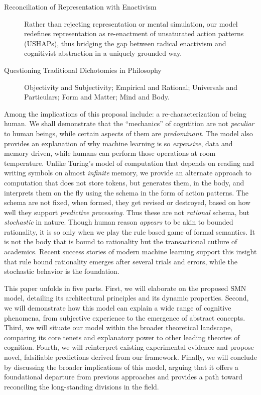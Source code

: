 \begin{description}
    \item[Reconciliation of Representation with Enactivism]
    Rather than rejecting representation or mental simulation, our model redefines representation as re-enactment of unsaturated action patterns (USHAPs), thus bridging the gap between radical enactivism and cognitivist abstraction in a uniquely grounded way.

    \item[Questioning Traditional Dichotomies in Philosophy]
    Objectivity and Subjectivity; Empirical and Rational; Universals and Particulars; Form and Matter; Mind and Body.

\end{description}


Among the implications of this proposal include: a re-characterization of being human. We shall demonstrate that the ``mechanics'' of cogntition are not \textit{peculiar} to human beings, while certain aspects of them are \textit{predominant}. The model also provides an explanation of why machine learning is so \textit{expensive}, data and memory driven, while humans can perform those operations at room temperature. Unlike Turing's model of computation that depends on reading and writing symbols on almost \textit{infinite} memory, we provide an alternate approach to computation that does not store tokens, but generates them, in the body, and interprets them on the fly using the schema in the form of action patterns. The schema are not fixed, when formed, they get revised or destroyed, based on how well they support \textit{predictive processing}. Thus these are not \textit{rational} schema, but \textit{stochastic} in nature. Though human reason \textit{appears} to be akin to bounded rationality, it is so only when we play the rule based game of formal semantics. It is not the body that is bound to rationality but the transactional cutlure of academics. Recent success stories of modern machine learning support this insight that rule bound rationality emerges after several trials and errors, while the stochastic behavior is the foundation. 

This paper unfolds in five parts. First, we will elaborate on the proposed SMN model, detailing its architectural principles and its dynamic properties. Second, we will demonstrate how this model can explain a wide range of cognitive phenomena, from subjective experience to the emergence of abstract concepts. Third, we will situate our model within the broader theoretical landscape, comparing its core tenets and explanatory power to other leading theories of cognition. Fourth, we will reinterpret existing experimental evidence and propose novel, falsifiable predictions derived from our framework. Finally, we will conclude by discussing the broader implications of this model, arguing that it offers a foundational departure from previous approaches and provides a path toward reconciling the long-standing divisions in the field.